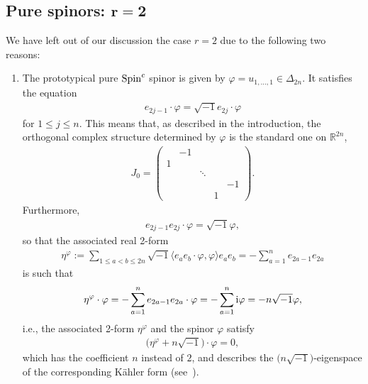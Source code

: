 \documentclass[10pt,a4paper]{amsart}
\numberwithin{equation}{section}
\begin{document}
\subsection[Pure spinors: $r=2$]{Pure spinors: $\boldsymbol{r=2}$}

We have left out of our discussion the case $r=2$ due to the following two reasons:
\begin{enumerate}\itemsep=0pt
\item The prototypical pure ${\rm Spin}^c$ spinor is given by $\varphi=u_{1,\dots,1}\in\Delta_{2n}$. It satisfies the equation
\begin{gather*}e_{2j-1}\cdot \varphi = \sqrt{-1} e_{2j}\cdot\varphi\end{gather*}
for $1\leq j\leq n$.
This means that, as described in the introduction, the orthogonal complex structure determined by $\varphi$ is the standard one on $\mathbb{R}^{2n}$,
\begin{gather*}J_0=\left(
\begin{matrix}
 & -1 & & & \\
1 & & & & \\
 & & \ddots & & \\
 & & & & -1\\
 & & & 1 &
\end{matrix}
\right).\end{gather*}
Furthermore,
\begin{gather*} e_{2j-1}e_{2j}\cdot\varphi = \sqrt{-1} \varphi ,\end{gather*}
so that the associated real 2-form
\begin{gather*}
\eta^\varphi := \sum_{1\leq a<b\leq 2n} \sqrt{-1}\langle e_a e_b \cdot \varphi,\varphi\rangle e_ae_b= -\sum_{a=1}^n e_{2a-1}e_{2a}
\end{gather*}
is such that
\begin{gather*}
 \eta^\varphi\cdot\varphi = -\sum_{a=1}^n e_{2a-1}e_{2a}\cdot\varphi= -\sum_{a=1}^n {\rm i}\varphi= - n \sqrt{-1} \varphi,
\end{gather*}
i.e., the associated 2-form $\eta^\varphi$ and the spinor $\varphi$ satisfy
\begin{gather*}\big(\eta^\varphi + n \sqrt{-1}\big)\cdot \varphi =0,\end{gather*}
which has the coefficient $n$ instead of $2$, and describes the $\big(n\sqrt{-1}\big)$-eigenspace of the corresponding K\"ahler form (see~\cite{Friedrich}).


\end{enumerate}
\end{document}
